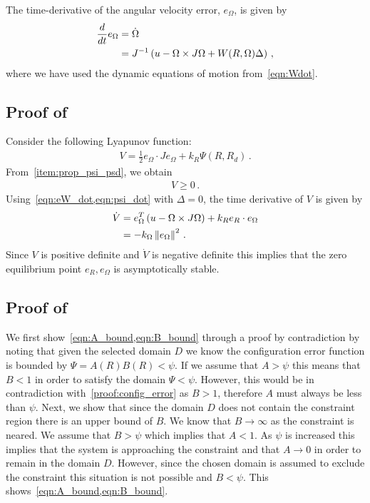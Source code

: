 \documentclass[letterpaper, 10 pt, conference]{ieeeconf}  %
\begin{document}
The time-derivative of the angular velocity error, \( e_\Omega \), is given by
\begin{align*}
	\frac{d }{d t} e_\Omega &= \dot{\Omega} \\
	&= J^{-1} \left( u - \Omega \times J \Omega + W(R,\Omega) \Delta  \right) \, ,
\end{align*}
where we have used the dynamic equations of motion from~\cref{eqn:Wdot}. 
\subsection{Proof of~}\label{proof:att_control}
	Consider the following Lyapunov function:
	\begin{gather}
		V = \frac{1}{2} e_\Omega \cdot J e_\Omega + k_R \Psi(R,R_d) \, . \label{eqn:v_nodist}
	\end{gather}
	From~\cref{item:prop_psi_psd}, we obtain
	\begin{gather*}
		V \geq 0 \, .
	\end{gather*}
	Using~\cref{eqn:eW_dot,eqn:psi_dot} with \( \Delta = 0 \), the time derivative of \( V \) is given by
	\begin{align}
		\dot{V} &= e_\Omega^T \left(  u - \Omega \times J \Omega  \right) + k_R e_R \cdot e_\Omega \nonumber \\
		&= -k_\Omega \left\| e_\Omega \right\|^2 \, . \label{eqn:vdot_nodist}
	\end{align}
	Since \( V \) is positive definite and \( \dot{V} \) is negative definite this implies that the zero equilibrium point \( e_R, e_\Omega \) is asymptotically stable.
	
\subsection{Proof of~}\label{proof:eR_dot_bound}
	We first show~\cref{eqn:A_bound,eqn:B_bound} through a proof by contradiction by noting that given the selected domain \( D \) we know the configuration error function is bounded by \( \Psi = A(R) B(R) < \psi\).
	If we assume that \( A > \psi \) this means that \( B < 1 \) in order to satisfy the domain \( \Psi < \psi \).
	However, this would be in contradiction with~\cref{proof:config_error} as \( B > 1 \), therefore \( A \) must always be less than \( \psi \).
	Next, we show that since the domain \( D \) does not contain the constraint region there is an upper bound of \(B\).
	We know that \( B \to \infty \) as the constraint is neared. 
	We assume that \( B > \psi \) which implies that \( A < 1 \).
	As \( \psi \) is increased this implies that the system is approaching the constraint and that \( A \to 0 \) in order to remain in the domain \( D \).
	However, since the chosen domain is assumed to exclude the constraint this situation is not possible and \( B < \psi \).
	This shows~\cref{eqn:A_bound,eqn:B_bound}.
	
\end{document}
